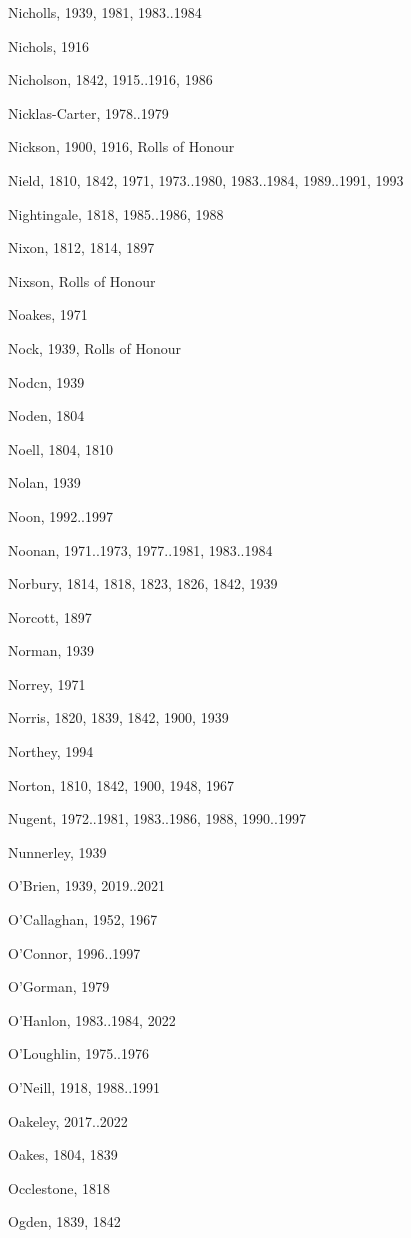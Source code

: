 \begin{theindex}
\item Nicholls, 1939, 1981, 1983..1984
\item Nichols, 1916
\item Nicholson, 1842, 1915..1916, 1986
\item Nicklas-Carter, 1978..1979
\item Nickson, 1900, 1916, Rolls of Honour
\item Nield, 1810, 1842, 1971, 1973..1980, 1983..1984, 1989..1991, 1993
\item Nightingale, 1818, 1985..1986, 1988
\item Nixon, 1812, 1814, 1897
\item Nixson, Rolls of Honour
\item Noakes, 1971
\item Nock, 1939, Rolls of Honour
\item Nodcn, 1939
\item Noden, 1804
\item Noell, 1804, 1810
\item Nolan, 1939
\item Noon, 1992..1997
\item Noonan, 1971..1973, 1977..1981, 1983..1984
\item Norbury, 1814, 1818, 1823, 1826, 1842, 1939
\item Norcott, 1897
\item Norman, 1939
\item Norrey, 1971
\item Norris, 1820, 1839, 1842, 1900, 1939
\item Northey, 1994
\item Norton, 1810, 1842, 1900, 1948, 1967
\item Nugent, 1972..1981, 1983..1986, 1988, 1990..1997
\item Nunnerley, 1939
\item O'Brien, 1939, 2019..2021
\item O'Callaghan, 1952, 1967
\item O'Connor, 1996..1997
\item O'Gorman, 1979
\item O'Hanlon, 1983..1984, 2022
\item O'Loughlin, 1975..1976
\item O'Neill, 1918, 1988..1991
\item Oakeley, 2017..2022
\item Oakes, 1804, 1839
\item Occlestone, 1818
\item Ogden, 1839, 1842

\end{theindex}
